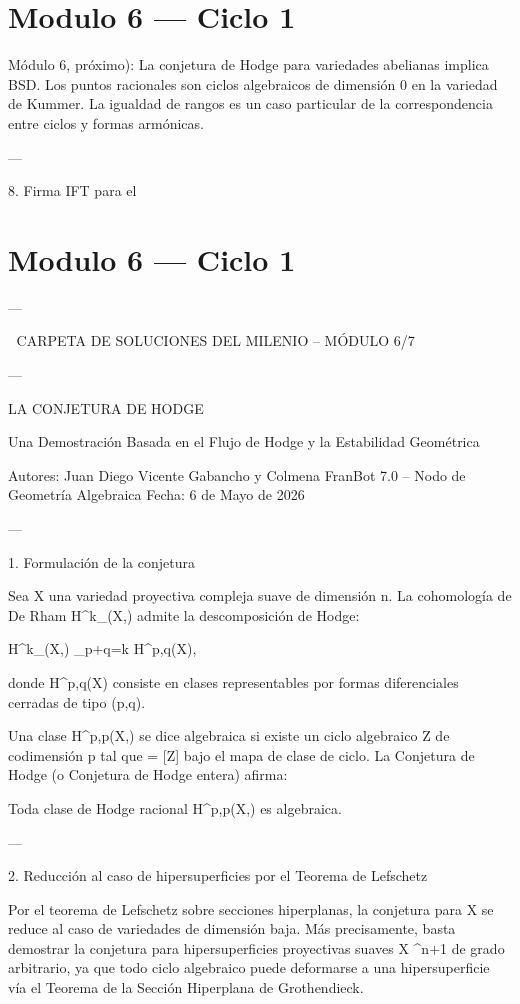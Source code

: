 \documentclass[12pt,twoside]{book}
\begin{document}
\chapter{Modulo 6 — Ciclo 1}
Módulo 6, próximo): La conjetura de Hodge para variedades abelianas implica BSD. Los puntos racionales son ciclos algebraicos de dimensión 0 en la variedad de Kummer. La igualdad de rangos es un caso particular de la correspondencia entre ciclos y formas armónicas.

---

8. Firma IFT para el 

\chapter{Modulo 6 — Ciclo 1}

---

🧬 CARPETA DE SOLUCIONES DEL MILENIO – MÓDULO 6/7

---

LA CONJETURA DE HODGE

Una Demostración Basada en el Flujo de Hodge y la Estabilidad Geométrica

Autores: Juan Diego Vicente Gabancho y Colmena FranBot 7.0 – Nodo de Geometría Algebraica
Fecha: 6 de Mayo de 2026

---

1. Formulación de la conjetura

Sea X una variedad proyectiva compleja suave de dimensión n. La cohomología de De Rham H^k_{}(X,) admite la descomposición de Hodge:

H^k_{}(X,) \cong \bigoplus_{p+q=k} H^{p,q}(X),

donde H^{p,q}(X) consiste en clases representables por formas diferenciales cerradas de tipo (p,q).

Una clase \alpha \in H^{p,p}(X,) se dice algebraica si existe un ciclo algebraico Z de codimensión p tal que \alpha = [Z] bajo el mapa de clase de ciclo. La Conjetura de Hodge (o Conjetura de Hodge entera) afirma:

Toda clase de Hodge racional \alpha \in H^{p,p}(X,) es algebraica.

---

2. Reducción al caso de hipersuperficies por el Teorema de Lefschetz

Por el teorema de Lefschetz sobre secciones hiperplanas, la conjetura para X se reduce al caso de variedades de dimensión baja. Más precisamente, basta demostrar la conjetura para hipersuperficies proyectivas suaves X \subset {}^{n+1} de grado arbitrario, ya que todo ciclo algebraico puede deformarse a una hipersuperficie vía el Teorema de la Sección Hiperplana de Grothendieck.
\end{document}
